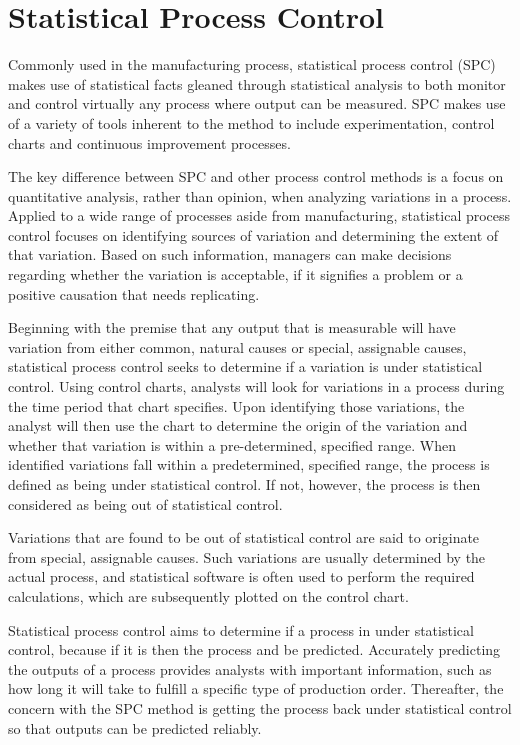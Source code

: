 \documentclass[12pt]{article}
\begin{document}
\tableofcontents

\newpage
\section{Statistical Process Control}
Commonly used in the manufacturing process, statistical process control (SPC) makes use of statistical facts gleaned through statistical analysis to both monitor and control virtually any process where output can be measured. SPC makes use of a variety of tools inherent to the method to include experimentation, control charts and continuous improvement processes. 


The key difference between SPC and other process control methods is a focus on quantitative analysis, rather than opinion, when analyzing variations in a process. Applied to a wide range of processes aside from manufacturing, statistical process control focuses on identifying sources of variation and determining the extent of that variation. Based on such information, 
managers can make decisions regarding whether the variation is acceptable, if it signifies a problem or a positive causation that needs replicating.


Beginning with the premise that any output that is measurable will have variation from either common, natural causes or special, assignable causes, statistical process control seeks to determine if a variation is under statistical control. Using control charts, analysts will look for variations in a process during the time period that chart specifies. Upon identifying those variations, the analyst will then use the chart to determine the origin of the variation and whether that variation is within a pre-determined, specified range. When identified variations fall within a predetermined, specified range, the process is defined as being under statistical control. If not, however, the process is then considered as being out of statistical control.


Variations that are found to be out of statistical control are said to originate from special, assignable causes. Such variations are usually determined by the actual process, and statistical software is often used to perform the required calculations, which are subsequently plotted on the control chart. 


Statistical process control aims to determine if a process in under statistical control, because if it is then the process and be predicted. Accurately predicting the outputs of a process provides analysts with important information, such as how long it will take to fulfill a specific type of production order. Thereafter, the concern with the SPC method is getting the process back under statistical control so that outputs can be predicted reliably.
\end{document}
